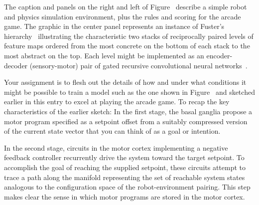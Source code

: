  The caption and panels on the right and left of Figure~{} describe a simple robot and physics simulation environment, plus the rules and scoring for the arcade game. The graphic in the center panel represents an instance of Fuster's hierarchy~\cite{FusterPREFRONTAL-CORTEX-15-CHAPTER_8} illustrating the characteristic two stacks of reciprocally paired levels of feature maps ordered from the most concrete on the bottom of each stack to the most abstract on the top. Each level might be implemented as an encoder-decoder (sensory-motor) pair of gated recursive convolutional neural networks~\cite{ChoetalCoRR-14}.

 Your assignment is to flesh out the details of how and under what conditions it might be possible to train a model such as the one shown in Figure~{} and sketched earlier in this entry to excel at playing the arcade game. To recap the key characteristics of the earlier sketch: In the first stage, the basal ganglia propose a motor program specified as a setpoint offset from a suitably compressed version of the current state vector that you can think of as a goal or intention. 

 In the second stage, circuits in the motor cortex implementing a negative feedback controller recurrently drive the system toward the target setpoint. To accomplish the goal of reaching the supplied setpoint, these circuits attempt to trace a path along the manifold representing the set of reachable system states analogous to the configuration space of the robot-environment pairing. This step makes clear the sense in which motor programs are stored in the motor cortex.

